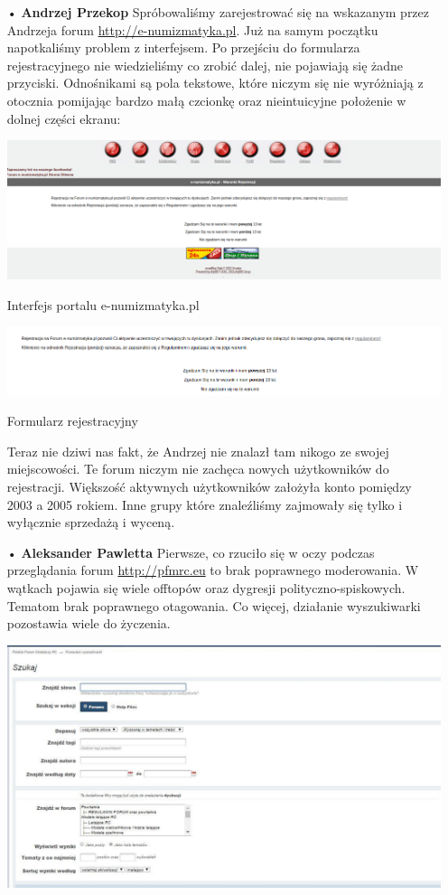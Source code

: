 \documentclass{article}
\begin{document}
\begin{enumerate}
\item[•]\textbf{Andrzej Przekop}\newline
Spróbowaliśmy zarejestrować się na wskazanym przez Andrzeja forum \url{ http://e-numizmatyka.pl}. Już na samym początku napotkaliśmy problem z interfejsem. Po przejściu do formularza rejestracyjnego nie wiedzieliśmy co zrobić dalej, nie pojawiają się żadne przyciski. Odnośnikami są pola tekstowe, które niczym się nie wyróżniają z otocznia pomijając bardzo małą czcionkę oraz nieintuicyjne położenie w dolnej części ekranu:\newline
\begin{center}
\includegraphics[width=\textwidth]{kck1}
\caption{Interfejs portalu e-numizmatyka.pl}
\end{center}
\begin{center}
\includegraphics[width=\textwidth]{kck2}
\caption{Formularz rejestracyjny}
\end{center}
Teraz nie dziwi nas fakt, że Andrzej nie znalazł tam nikogo ze swojej miejscowości. Te forum niczym nie zachęca nowych użytkowników do rejestracji. Większość aktywnych użytkowników założyła konto pomiędzy 2003 a 2005 rokiem. Inne grupy które znaleźliśmy zajmowały się tylko i wyłącznie sprzedażą i wyceną.
\item[•]\textbf{Aleksander Pawletta}\newline
Pierwsze, co rzuciło się w oczy podczas przeglądania forum \url{http://pfmrc.eu} to brak poprawnego moderowania. W wątkach pojawia się wiele offtopów oraz dygresji polityczno-spiskowych. Tematom brak poprawnego otagowania. Co więcej, działanie wyszukiwarki pozostawia wiele do życzenia.
\begin{center}
\includegraphics[width=\textwidth]{1}

\end{center}
\end{enumerate}
\end{document}
